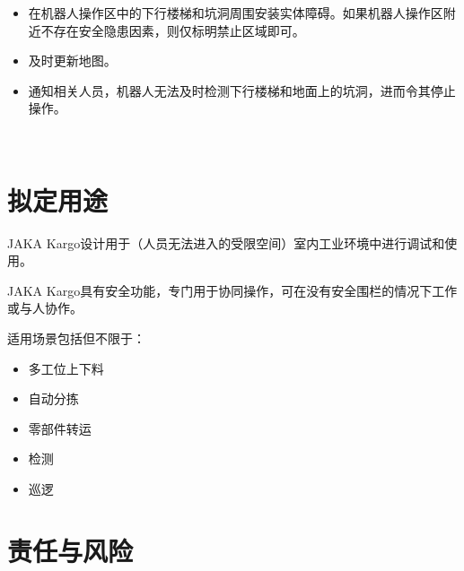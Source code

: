 \documentclass[a4paper,11pt,english,openany,oneside]{sphinxmanual}
\begin{document}
\begin{savenotes}
\begin{tabular}[t]{}
\begin{varwidth}[t]{}
\begin{itemize}
\begin{itemize}
\item {} 
\sphinxAtStartPar
在机器人操作区中的下行楼梯和坑洞周围安装实体障碍。如果机器人操作区附近不存在安全隐患因素，则仅标明禁止区域即可。

\item {} 
\sphinxAtStartPar
及时更新地图。

\item {} 
\sphinxAtStartPar
通知相关人员，机器人无法及时检测下行楼梯和地面上的坑洞，进而令其停止操作。

\end{itemize}

\end{itemize}
\sphinxbeforeendvarwidth
\end{varwidth}%
\\
\sphinxbottomrule
\end{tabular}
\sphinxtableafterendhook\par
\sphinxattableend\end{savenotes}


\section{拟定用途}
\label{\detokenize{05 _u5b89_u5168_u89c4_u8303:id6}}
\sphinxAtStartPar
JAKA Kargo设计用于（人员无法进入的受限空间）室内工业环境中进行调试和使用。

\sphinxAtStartPar
JAKA Kargo具有安全功能，专门用于协同操作，可在没有安全围栏的情况下工作或与人协作。

\sphinxAtStartPar
适用场景包括但不限于：
\begin{itemize}
\item {} 
\sphinxAtStartPar
多工位上下料

\item {} 
\sphinxAtStartPar
自动分拣

\item {} 
\sphinxAtStartPar
零部件转运

\item {} 
\sphinxAtStartPar
检测

\item {} 
\sphinxAtStartPar
巡逻

\end{itemize}


\section{责任与风险}
\label{\detokenize{05 _u5b89_u5168_u89c4_u8303:id7}}
\sphinxAtStartPar
{}
\end{document}
